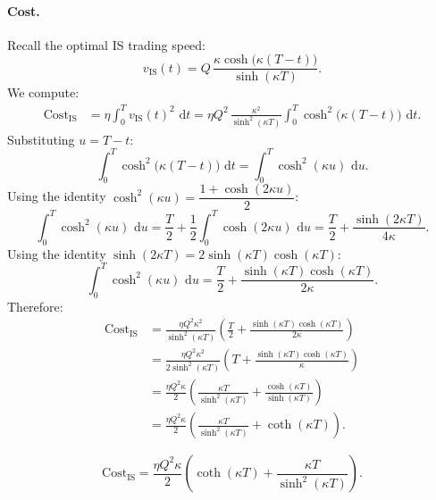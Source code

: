 \documentclass[12pt, a4paper]{article}
\newcommand{\dd}{\,\mathrm{d}}
\newcommand{\kap}{\kappa}
\begin{document}
\paragraph{Cost.}
Recall the optimal IS trading speed:
\[
  v_{\mathrm{IS}}(t) = Q\,\frac{\kap\cosh\!\bigl(\kap(T-t)\bigr)}{\sinh(\kap T)}.
\]
We compute:
\begin{align*}
  \mathrm{Cost}_{\mathrm{IS}}
  &= \eta\int_0^T v_{\mathrm{IS}}(t)^2\,\dd t
   = \eta Q^2\,\frac{\kap^2}{\sinh^2(\kap T)}\int_0^T \cosh^2\!\bigl(\kap(T-t)\bigr)\,\dd t.
\end{align*}
Substituting $u = T - t$:
\[
  \int_0^T \cosh^2\!\bigl(\kap(T-t)\bigr)\,\dd t
  = \int_0^T \cosh^2(\kap u)\,\dd u.
\]
Using the identity $\cosh^2(\kap u) = \dfrac{1 + \cosh(2\kap u)}{2}$:
\[
  \int_0^T \cosh^2(\kap u)\,\dd u
  = \frac{T}{2} + \frac{1}{2}\int_0^T \cosh(2\kap u)\,\dd u
  = \frac{T}{2} + \frac{\sinh(2\kap T)}{4\kap}.
\]
Using the identity $\sinh(2\kap T) = 2\sinh(\kap T)\cosh(\kap T)$:
\[
  \int_0^T \cosh^2(\kap u)\,\dd u
  = \frac{T}{2} + \frac{\sinh(\kap T)\cosh(\kap T)}{2\kap}.
\]
Therefore:
\begin{align*}
  \mathrm{Cost}_{\mathrm{IS}}
  &= \frac{\eta Q^2 \kap^2}{\sinh^2(\kap T)}
     \left(\frac{T}{2} + \frac{\sinh(\kap T)\cosh(\kap T)}{2\kap}\right) \\
  &= \frac{\eta Q^2 \kap^2}{2\sinh^2(\kap T)}
     \left(T + \frac{\sinh(\kap T)\cosh(\kap T)}{\kap}\right) \\
  &= \frac{\eta Q^2 \kap}{2}
     \left(\frac{\kap T}{\sinh^2(\kap T)} + \frac{\cosh(\kap T)}{\sinh(\kap T)}\right) \\
  &= \frac{\eta Q^2 \kap}{2}
     \left(\frac{\kap T}{\sinh^2(\kap T)} + \coth(\kap T)\right).
\end{align*}

\begin{resultbox}
\[
  \mathrm{Cost}_{\mathrm{IS}}
  = \frac{\eta Q^2 \kap}{2}
    \left(\coth(\kap T) + \frac{\kap T}{\sinh^2(\kap T)}\right).
\]
\end{resultbox}
\end{document}
